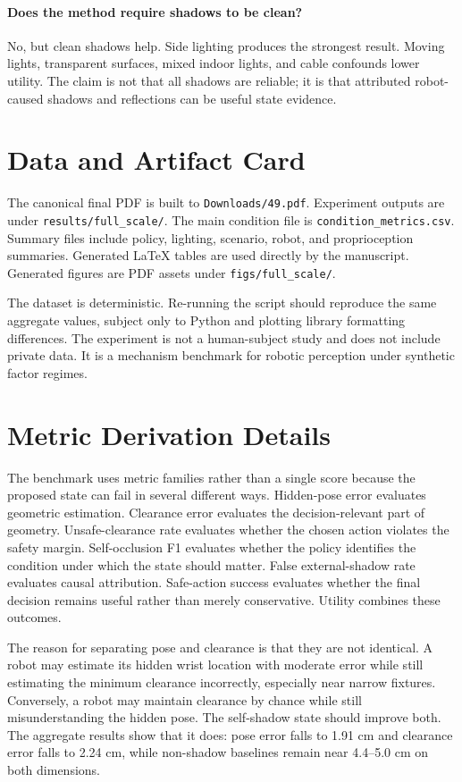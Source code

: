 \documentclass{article}
\begin{document}
\paragraph{Does the method require shadows to be clean?}
No, but clean shadows help. Side lighting produces the strongest result. Moving lights, transparent surfaces, mixed indoor lights, and cable confounds lower utility. The claim is not that all shadows are reliable; it is that attributed robot-caused shadows and reflections can be useful state evidence.

\section{Data and Artifact Card}

The canonical final PDF is built to \texttt{Downloads/49.pdf}. Experiment outputs are under \texttt{results/full\_scale/}. The main condition file is \texttt{condition\_metrics.csv}. Summary files include policy, lighting, scenario, robot, and proprioception summaries. Generated LaTeX tables are used directly by the manuscript. Generated figures are PDF assets under \texttt{figs/full\_scale/}.

The dataset is deterministic. Re-running the script should reproduce the same aggregate values, subject only to Python and plotting library formatting differences. The experiment is not a human-subject study and does not include private data. It is a mechanism benchmark for robotic perception under synthetic factor regimes.

\clearpage
\section{Metric Derivation Details}

The benchmark uses metric families rather than a single score because the proposed state can fail in several different ways. Hidden-pose error evaluates geometric estimation. Clearance error evaluates the decision-relevant part of geometry. Unsafe-clearance rate evaluates whether the chosen action violates the safety margin. Self-occlusion F1 evaluates whether the policy identifies the condition under which the state should matter. False external-shadow rate evaluates causal attribution. Safe-action success evaluates whether the final decision remains useful rather than merely conservative. Utility combines these outcomes.

The reason for separating pose and clearance is that they are not identical. A robot may estimate its hidden wrist location with moderate error while still estimating the minimum clearance incorrectly, especially near narrow fixtures. Conversely, a robot may maintain clearance by chance while still misunderstanding the hidden pose. The self-shadow state should improve both. The aggregate results show that it does: pose error falls to 1.91 cm and clearance error falls to 2.24 cm, while non-shadow baselines remain near 4.4--5.0 cm on both dimensions.
\end{document}
